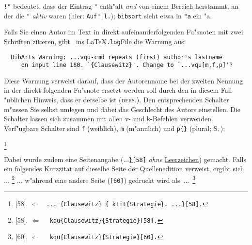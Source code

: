 \documentclass[12pt,a4paper]{article}
\newcommand{\pbs}{\string\ \unskip}
\newcommand{\bs}{\protect\pbs}
\begin{document}
 \vspace{-2.75ex}\noindent 
 \verb|!"| bedeutet, dass der Eintrag \verb|"| enth"alt \textit{und} 
 von einem Bereich herstammt, an der die \verb|"| \textit{aktiv} waren (hier: \verb+Auf"|l.+); 
 \texttt{bibsort} sieht etwa in \verb|"a| ein "a. 
 
 Falls Sie einen Autor im Text in direkt aufeinanderfolgenden Fu"snoten mit zwei Schriften 
 zitieren, gibt \BibArts\ ins \LaTeX\hy\ko\verb|.log|\hy File die Warnung aus:%

  \vspace{-.75ex}
  {\footnotesize\begin{verbatim} 
  BibArts Warning: ...vqu-cmd repeats (first) author's lastname 
     on input line 180. `{Clausewitz}'. Change to `...vqu[m,f,p]'?
  \end{verbatim}}

 \vspace{-3.25ex}\noindent 
 Diese Warnung verweist darauf, dass der Autorenname
 bei der zweiten Nennung in der direkt folgenden Fu"snote ersetzt 
 werden soll durch den in diesem Fall "ublichen Hinweis, dass er derselbe 
 ist (\textsc{ders.}). Den entsprechenden Schalter m"ussen Sie
 selbst umlegen und dabei das Geschlecht des Autors einstellen. 
 Die Schalter lassen sich zusammen mit allen v- und k-Befehlen 
 verwenden. Verf"ugbare Schalter sind
 \verb|f| (weiblich), \verb|m| (m"annlich) und \verb|p{}| (plural; S.\,\pageref{p}):

{\renewcommand{\thefootnote}{{\bfseries\arabic{footnote}}}%
 \footnote{[58].
 \hspace{.8em} $\Leftarrow$ \ \texttt{... \{Clausewitz\} \{\bs ktit\{Strategie\}. ...\}[58].}}%
}

\vspace{1.ex}\noindent 
Dabei wurde zudem eine Seitenangabe (...\texttt{\underline{\}[}58]} 
\textit{ohne} \underline{Leerzeichen}) gemacht. Falls ein folgendes Kurzzitat auf 
dieselbe Seite der Quellenedition verweist, ergibt sich ... 
{\renewcommand{\thefootnote}{{\bfseries\itshape\arabic{footnote}}}%
 \footnote{[58].\label{ErsterFall} 
 \hspace{5.95em} $\Leftarrow$ \ \texttt{\bs kqu\{Clausewitz\}\{Strategie\}[58].}}
} ... w"ahrend eine andere Seite (\verb|[60]|) gedruckt wird 
als~...~\footnote{[60]. 
\hspace{3.05em} $\Leftarrow$ \ \texttt{\bs kqu\{Clausewitz\}\{Strategie\}[60].}}
\end{document}
